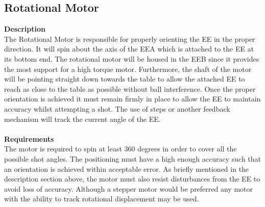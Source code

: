 \documentclass[titlepage]{article}
\begin{document}
\begin{center}
\begin{center}
\begin{center}
\begin{center}
\begin{center}
\begin{center}
\begin{center}
\begin{center}
\begin{center}
\begin{center}
\begin{center}
\begin{center}
\begin{center}
\begin{center}
\begin{center}
\begin{center}
\begin{center}
\begin{center}
\begin{center}
\begin{center}
\subsection{Rotational Motor}
\textbf{Description}\\
The Rotational Motor is responsible for properly orienting the EE in the proper direction. It will spin about the axis of the EEA which is attached to the EE at its bottom end. The rotational motor will be housed in the EEB since it provides the most support for a high torque motor. Furthermore, the shaft of the motor will be pointing straight down towards the table to allow the attached EE to reach as close to the table as possible without ball interference. Once the proper orientation is achieved it must remain firmly in place to allow the EE to maintain accuracy whilst attempting a shot. The use of steps or another feedback mechanism will track the current angle of the EE.\\\\
\textbf{Requirements}\\
The motor is required to spin at least 360 degrees in order to cover all the possible shot angles. The positioning must have a high enough accuracy such that an orientation is achieved within acceptable error. As briefly mentioned in the description section above, the motor must also resist disturbances from the EE to avoid loss of accuracy. Although a stepper motor would be preferred any motor with the ability to track rotational displacement may be used.


\end{center}
\end{center}
\end{center}
\end{center}
\end{center}
\end{center}
\end{center}
\end{center}
\end{center}
\end{center}
\end{center}
\end{center}
\end{center}
\end{center}
\end{center}
\end{center}
\end{center}
\end{center}
\end{center}
\end{center}
\end{document}
